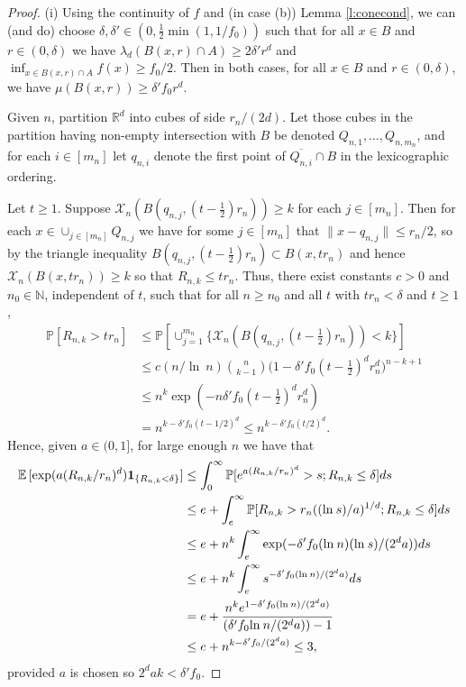 \documentclass[10pt,a4paper]{amsart}
\newcommand{\E}{\mathbb E \,}
\newcommand{\N}{\mathbb{N}}
\newcommand{\R}{\mathbb{R}}
\newcommand{\X}{\mathcal{X}}
\renewcommand{\Pr}{\mathbb{P}}
\renewcommand{\log}{{\ln \:}}
\begin{document}
\begin{proof}
	(i) 
	Using the continuity of $f$ and (in case (b)) 
	Lemma \ref{l:conecond}, we can (and do) choose
	$\delta, \delta' \in ( 0, \frac12 \min(1, 1/f_0))$ such that 
	for all $x \in B $ and $r \in (0,\delta)$ we have
	$\lambda_d(B(x,r) \cap A) \geq 2 \delta' r^d$ and
	$\inf_{x \in B(x,r) \cap A} f(x) \geq f_0/2$.
	Then in both cases, for all $x \in B$ and $r \in (0,\delta)$,
	we have $\mu(B(x,r)) \geq \delta' f_0 r^d$.

	Given $n$, partition  $\R^d$ into cubes  
	of side $r_n/(2d)$. Let those cubes in the partition  having
	non-empty intersection with   %
	$B$ be denoted
	$Q_{n,1},\ldots, Q_{n,m_n}$, and for each $i \in [m_n]$
	let $q_{n,i}$ denote the first point of $\overline{Q_{n,i}} 
	\cap B$ in the lexicographic ordering.

Let $t \geq 1$.
	Suppose $\X_n ( B(q_{n,j}, (t- \frac12) r_n)) \geq k$
for  each $j \in [m_n]$.
	Then for  each $x \in \cup_{j \in [m_n]} Q_{n,j}$
	we have
	for some $j \in [m_n]$ that
	$\|x-q_{n,j} \| \leq r_n/2$,
	so by the triangle inequality
	$B(q_{n,j},(t- \frac12) r_n) \subset B(x,t r_n)$ and hence
	$\X_n(B(x,t r_n)) \geq k$
	so that $R_{n,k} \leq t r_n$. Thus,
there exist constants $c >0$ and $n_0 \in \N$,
 independent of $t$, such that
for all $n \geq n_0$ and all $t$ with
 $t r_n < \delta$ and $t \geq 1$, 
	\begin{align*}
	\Pr[ R_{n,k} > t r_n] & \leq \Pr [ \cup_{j=1}^{m_n} 
	\{ \X_n ( B(q_{n,j},(t- \tfrac12) r_n )) < k  \} ]
\\
	& \leq c (n/\log n) \binom{n}{k-1}
	\big(1 -  \delta' f_0 (t - \tfrac12 )^d  r_n^d \big)^{n-k+1}
\\
	& \leq n^k \exp (- n \delta' f_0 (t- \tfrac12)^d r_n^d) 
\\
		& =  n^{k- \delta' f_0(t-1/2)^d} \leq n^{k- \delta' f_0(t/2)^d}.
		\end{align*}
	Hence, given $a \in ( 0,1]$, for large enough $n$ we have that
	\begin{align}
	\E[ \exp(a (R_{n,k}/r_n)^d ) {\bf 1}_{\{R_{n,k} < \delta \}} ]
		& \leq \int_0^\infty \Pr[ e^{a (R_{n,k}/r_n)^d} > s; R_{n,k} \leq \delta] ds
\nonumber \\
		& \leq e +  \int_e^\infty \Pr[  R_{n,k} > r_n( (\log s)/a)^{1/d}; R_{n,k} \leq \delta] ds
\nonumber \\
		& \leq e+  n^k \int_e^\infty \exp(   - \delta' 
		f_0 (\log n) (\log s) / (2^{d} a )) ds
\nonumber \\
		& \leq e+  n^k \int_e^\infty s^{ - \delta' f_0 (\log n) / (2^{d} a )}  ds
\nonumber \\
		& = e + \frac{n^k e^{1- \delta' f_0 (\log n)/(2^{d} a) } }{
			(\delta' f_0 \log n/(2^{d} a)) -1 } 
\nonumber \\
		& \leq e + n^{ k - \delta' f_0 /(2^{d} a)} \leq 3, 
\label{0308a}
	\end{align}
provided $a$ is chosen so $2^{d} a k  < \delta' f_0 $.




\end{proof}
\end{document}
